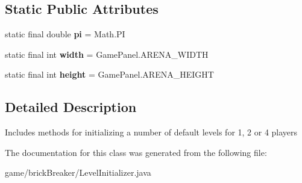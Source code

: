 \subsection*{Static Public Attributes}
\begin{DoxyCompactItemize}
\item 
\hypertarget{classbrick_breaker_1_1_level_initializer_abf93f8503b568500ca05a1c6b7189788}{
static final double {\bfseries pi} = Math.PI}
\label{classbrick_breaker_1_1_level_initializer_abf93f8503b568500ca05a1c6b7189788}

\item 
\hypertarget{classbrick_breaker_1_1_level_initializer_a725f415e02e42e2d8cf49e83ebd245ef}{
static final int {\bfseries width} = GamePanel.ARENA\_\-WIDTH}
\label{classbrick_breaker_1_1_level_initializer_a725f415e02e42e2d8cf49e83ebd245ef}

\item 
\hypertarget{classbrick_breaker_1_1_level_initializer_a7bf5b50b3f52b878e4071b64b75f530e}{
static final int {\bfseries height} = GamePanel.ARENA\_\-HEIGHT}
\label{classbrick_breaker_1_1_level_initializer_a7bf5b50b3f52b878e4071b64b75f530e}

\end{DoxyCompactItemize}


\subsection{Detailed Description}
Includes methods for initializing a number of default levels for 1, 2 or 4 players 

The documentation for this class was generated from the following file:\begin{DoxyCompactItemize}
\item 
game/brickBreaker/LevelInitializer.java\end{DoxyCompactItemize}
